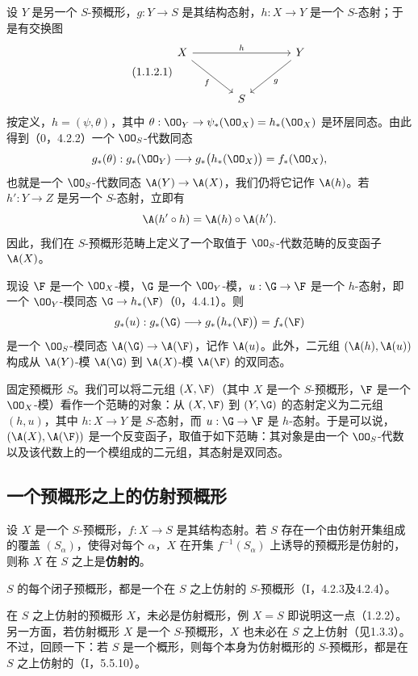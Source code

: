 设 $Y$ 是另一个 $S$-预概形，$g:Y\to S$ 是其结构态射，$h:X\to Y$ 是一个 $S$-态射；于是有交换图
\begin{equation}\tag{1.1.2.1}
\begin{tikzcd}[column sep=large,row sep=large]
X \arrow[rr,"h"] \arrow[dr,"f"'] && Y \arrow[dl,"g"]\\
& S &
\end{tikzcd}
\end{equation}
按定义，$h=(\psi,\theta)$，其中
$\theta:\OO_Y\to\psi_*(\OO_X)=h_*(\OO_X)$ 是环层同态。由此得到（0，4.2.2）一个 $\OO_S$-代数同态
\[
g_*(\theta):g_*(\OO_Y)\longrightarrow g_*\bigl(h_*(\OO_X)\bigr)=f_*(\OO_X),
\]
也就是一个 $\OO_S$-代数同态 $\A(Y)\to\A(X)$，我们仍将它记作 $\A(h)$。若 $h':Y\to Z$ 是另一个 $S$-态射，立即有
\[
\A(h'\circ h)=\A(h)\circ\A(h').
\]
因此，我们在 $S$-预概形范畴上定义了一个取值于 $\OO_S$-代数范畴的反变函子 $\A(X)$。

现设 $\F$ 是一个 $\OO_X$-模，$\G$ 是一个 $\OO_Y$-模，$u:\G\to\F$ 是一个 $h$-态射，即一个 $\OO_Y$-模同态 $\G\to h_*(\F)$（0，4.4.1）。则
\[
g_*(u):g_*(\G)\longrightarrow g_*\bigl(h_*(\F)\bigr)=f_*(\F)
\]
是一个 $\OO_S$-模同态 $\A(\G)\to\A(\F)$，记作 $\A(u)$。此外，二元组 $(\A(h),\A(u))$ 构成从 $\A(Y)$-模 $\A(\G)$ 到 $\A(X)$-模 $\A(\F)$ 的双同态。

固定预概形 $S$。我们可以将二元组 $(X,\F)$（其中 $X$ 是一个 $S$-预概形，$\F$ 是一个 $\OO_X$-模）看作一个范畴的对象：从 $(X,\F)$ 到 $(Y,\G)$ 的态射定义为二元组 $(h,u)$，其中 $h:X\to Y$ 是 $S$-态射，而 $u:\G\to\F$ 是 $h$-态射。于是可以说，$(\A(X),\A(\F))$ 是一个反变函子，取值于如下范畴：其对象是由一个 $\OO_S$-代数以及该代数上的一个模组成的二元组，其态射是双同态。

\subsection{一个预概形之上的仿射预概形}
设 $X$ 是一个 $S$-预概形，$f:X\to S$ 是其结构态射。若 $S$ 存在一个由仿射开集组成的覆盖 $(S_\alpha)$，使得对每个 $\alpha$，$X$ 在开集 $f^{-1}(S_\alpha)$ 上诱导的预概形是仿射的，则称 $X$ 在 $S$ 之上是\textbf{仿射的}。

$S$ 的每个闭子预概形，都是一个在 $S$ 之上仿射的 $S$-预概形（I，4.2.3及4.2.4）。

在 $S$ 之上仿射的预概形 $X$，未必是仿射概形，例 $X=S$ 即说明这一点（1.2.2）。另一方面，若仿射概形 $X$ 是一个 $S$-预概形，$X$ 也未必在 $S$ 之上仿射（见1.3.3）。不过，回顾一下：若 $S$ 是一个概形，则每个本身为仿射概形的 $S$-预概形，都是在 $S$ 之上仿射的（I，5.5.10）。

